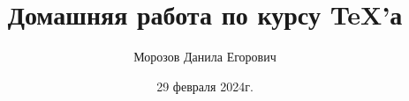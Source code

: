\documentclass{article}
\title{\bfseries Домашняя работа \textnumero 8 по курсу \TeX'а}
\author{Морозов Данила Егорович}
\date{29 февраля 2024г.}
\begin{document}

\pagebreak


\end{document}
